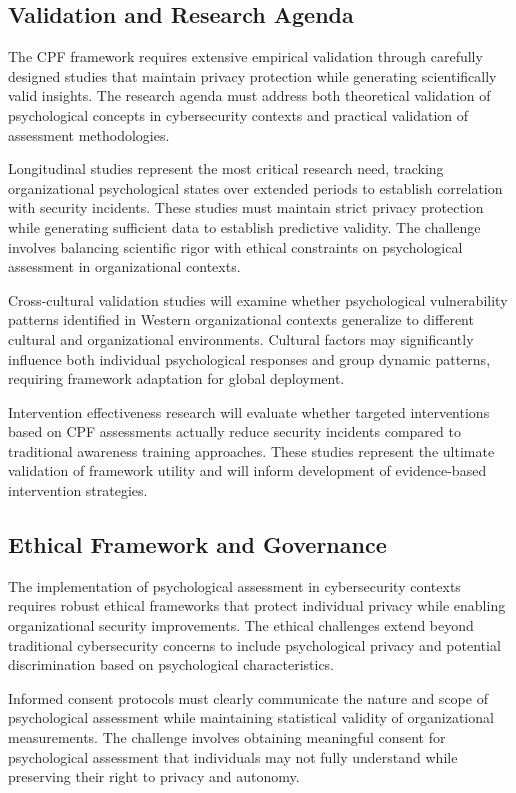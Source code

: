 \documentclass[11pt,a4paper]{article}
\begin{document}
\subsection{Validation and Research Agenda}

The CPF framework requires extensive empirical validation through carefully designed studies that maintain privacy protection while generating scientifically valid insights. The research agenda must address both theoretical validation of psychological concepts in cybersecurity contexts and practical validation of assessment methodologies.

Longitudinal studies represent the most critical research need, tracking organizational psychological states over extended periods to establish correlation with security incidents. These studies must maintain strict privacy protection while generating sufficient data to establish predictive validity. The challenge involves balancing scientific rigor with ethical constraints on psychological assessment in organizational contexts.

Cross-cultural validation studies will examine whether psychological vulnerability patterns identified in Western organizational contexts generalize to different cultural and organizational environments. Cultural factors may significantly influence both individual psychological responses and group dynamic patterns, requiring framework adaptation for global deployment.

Intervention effectiveness research will evaluate whether targeted interventions based on CPF assessments actually reduce security incidents compared to traditional awareness training approaches. These studies represent the ultimate validation of framework utility and will inform development of evidence-based intervention strategies.

\subsection{Ethical Framework and Governance}

The implementation of psychological assessment in cybersecurity contexts requires robust ethical frameworks that protect individual privacy while enabling organizational security improvements. The ethical challenges extend beyond traditional cybersecurity concerns to include psychological privacy and potential discrimination based on psychological characteristics.

Informed consent protocols must clearly communicate the nature and scope of psychological assessment while maintaining statistical validity of organizational measurements. The challenge involves obtaining meaningful consent for psychological assessment that individuals may not fully understand while preserving their right to privacy and autonomy.
\end{document}
